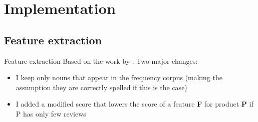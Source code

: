 \documentclass{beamer}
\begin{document}
\section{Implementation}

\subsection{Feature extraction}
\begin{frame}{Feature extraction}
Based on the work by \cite{scaffidi2007red}. Two major changes:
\begin{itemize}
    \item I keep only nouns that appear in the frequency corpus (making the assumption they are correctly spelled if this is the case)
    \item I added a modified score that lowers the score of a feature \textbf{F} for product \textbf{P} if P has only few reviews
\end{itemize}
%
%
\end{frame}
\end{document}
